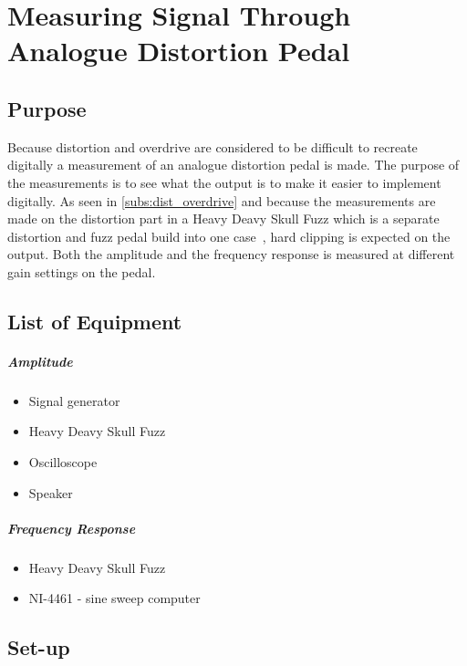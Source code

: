 \chapter{Measuring Signal Through Analogue Distortion Pedal} %
\label{cha:measuring_distortion_pedal_output}

\section{Purpose}
Because distortion and overdrive are considered to be difficult to recreate digitally a measurement of an analogue distortion pedal is made. The purpose of the measurements is to see what the output is to make it easier to implement digitally. As seen in \autoref{subs:dist_overdrive} and because the measurements are made on the distortion part in a Heavy Deavy Skull Fuzz which is a separate distortion and fuzz pedal build into one case \citep{skull_fuzz}, hard clipping is expected  on the output. Both the amplitude and the frequency response is measured at different gain settings on the pedal. 

\section{List of Equipment}
\paragraph*{Amplitude}

\begin{itemize}
	\item Signal generator
	\item Heavy Deavy Skull Fuzz \citep{skull_fuzz}
	\item Oscilloscope 
	\item Speaker
\end{itemize}

\paragraph*{Frequency Response}

\begin{itemize}
	\item Heavy Deavy Skull Fuzz \citep{skull_fuzz}
	\item NI-4461 - sine sweep computer
\end{itemize}

\section{Set-up}
